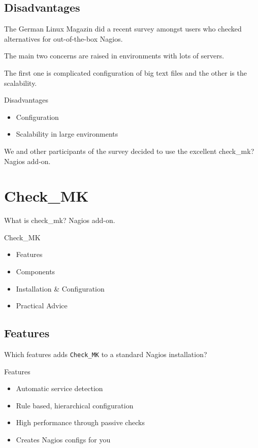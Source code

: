\subsection{Disadvantages}

The German Linux Magazin did a recent survey amongst users
who checked alternatives for out-of-the-box Nagios.

The main two concerns are raised in environments with lots
of servers.

The first one is complicated configuration of big text files
and the other is the scalability.

\begin{frame}{Disadvantages}

\begin{itemize}
\item Configuration
\item Scalability in large environments
\end{itemize}
\end{frame}

We and other participants of the survey decided to use the excellent 
check\_mk? Nagios add-on.

\section{Check\_MK}

What is check\_mk? Nagios add-on.

\begin{frame}[fragile]{Check\_MK}
\begin{itemize}
\item Features
\item Components
\item Installation \& Configuration
\item Practical Advice
\end{itemize}
\end{frame}

\subsection{Features}

Which features adds \verb|Check_MK| to a standard Nagios installation?

\begin{frame}[fragile]{Features}
\begin{itemize}
\item Automatic service detection
\item Rule based, hierarchical configuration
\item High performance through passive checks
\item Creates Nagios configs for you
\end{itemize}
\end{frame}


